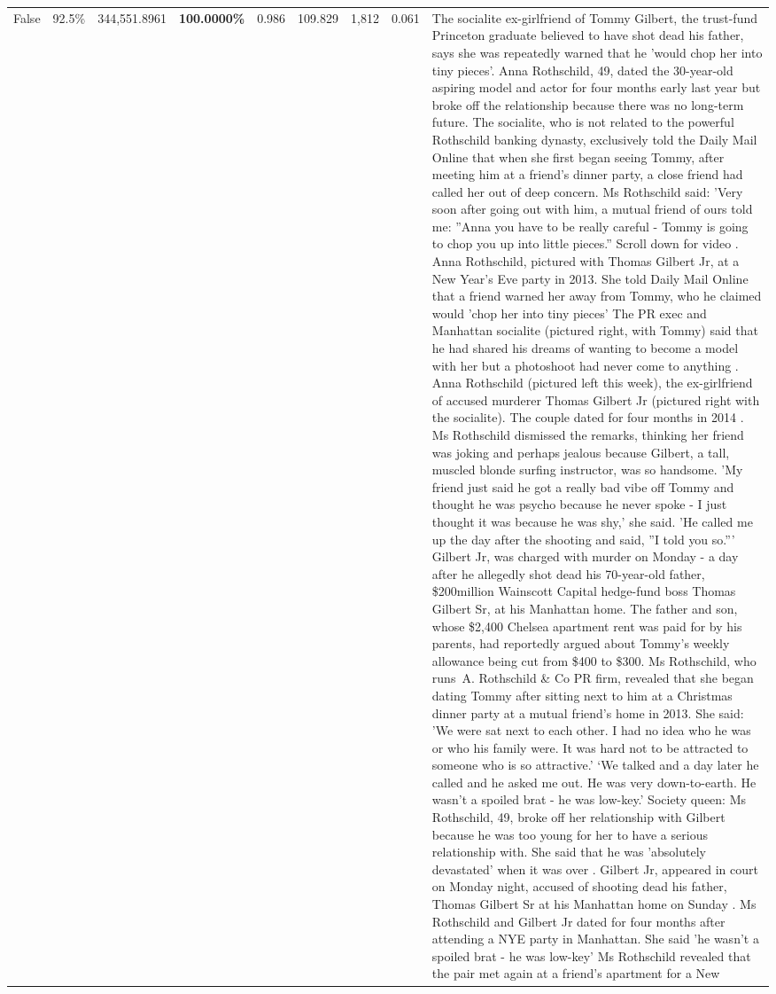 \begin{table}[H]
\begin{tabular}{lllrlllll}
False & 92.5\% & 344,551.8961 & \bfseries \color{red} 100.0000\% & 0.986 & 109.829 & 1,812 & 0.061 & The socialite ex-girlfriend of Tommy Gilbert, the trust-fund Princeton graduate believed to have shot dead his father, says she was repeatedly warned that he 'would chop her into tiny pieces'. Anna Rothschild, 49, dated the 30-year-old aspiring model and actor for four months early last year but broke off the relationship because there was no long-term future. The socialite, who is not related to the powerful Rothschild banking dynasty, exclusively told the Daily Mail Online that when she first began seeing Tommy, after meeting him at a friend's dinner party, a close friend had called her out of deep concern. Ms Rothschild said: 'Very soon after going out with him, a mutual friend of ours told me: ''Anna you have to be really careful - Tommy is going to chop you up into little pieces.'' Scroll down for video . Anna Rothschild, pictured with Thomas Gilbert Jr, at a New Year's Eve party in 2013. She told Daily Mail Online that a friend warned her away from Tommy, who he claimed would 'chop her into tiny pieces' The PR exec and Manhattan socialite (pictured right, with Tommy) said that he had shared his dreams of wanting to become a model with her but a photoshoot had never come to anything . Anna Rothschild (pictured left this week), the ex-girlfriend of accused murderer Thomas Gilbert Jr (pictured right with the socialite). The couple dated for four months in 2014 . Ms Rothschild dismissed the remarks, thinking her friend was joking and perhaps jealous because Gilbert, a tall, muscled blonde surfing instructor, was so handsome. 'My friend just said he got a really bad vibe off Tommy and thought he was psycho because he never spoke - I just thought it was because he was shy,' she said. 'He called me up the day after the shooting and said, ''I told you so.''' Gilbert Jr, was charged with murder on Monday - a day after he allegedly shot dead his 70-year-old father, \$200million Wainscott Capital hedge-fund boss Thomas Gilbert Sr, at his Manhattan home. The father and son, whose \$2,400 Chelsea apartment rent was paid for by his parents, had reportedly argued about Tommy's weekly allowance being cut from \$400 to \$300. Ms Rothschild, who runs A. Rothschild \& Co PR firm, revealed that she began dating Tommy after sitting next to him at a Christmas dinner party at a mutual friend's home in 2013. She said: 'We were sat next to each other. I had no idea who he was or who his family were. It was hard not to be attracted to someone who is so attractive.' ‘We talked and a day later he called and he asked me out. He was very down-to-earth. He wasn’t a spoiled brat - he was low-key.’ Society queen: Ms Rothschild, 49, broke off her relationship with Gilbert because he was too young for her to have a serious relationship with. She said that he was 'absolutely devastated' when it was over . Gilbert Jr, appeared in court on Monday night, accused of shooting dead his father, Thomas Gilbert Sr at his Manhattan home on Sunday . Ms Rothschild and Gilbert Jr dated for four months after attending a NYE party in Manhattan. She said 'he wasn't a spoiled brat - he was low-key' Ms Rothschild revealed that the pair met again at a friend’s apartment for a New 
\end{tabular}
\end{table}
